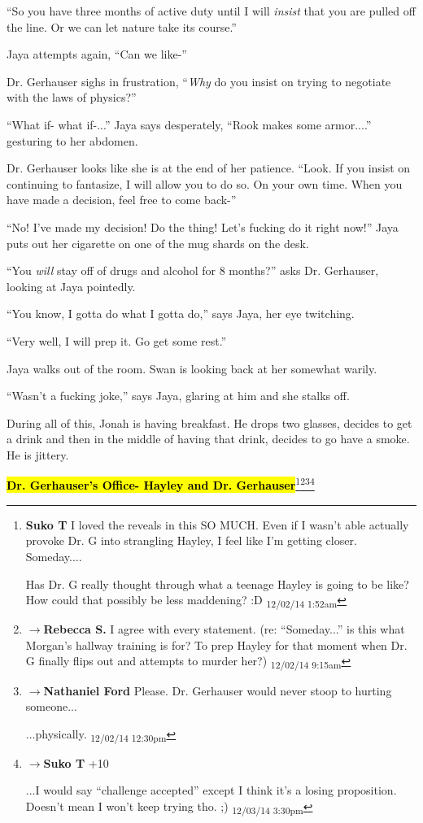 ``So you have three months of active duty until I will \textit{insist} that you are pulled off the line.  Or we can let nature take its course.''

Jaya attempts again, ``Can we like-''

Dr. Gerhauser sighs in frustration, ``\textit{Why} do you insist on trying to negotiate with the laws of physics?''

``What if- what if-...'' Jaya says desperately, ``Rook makes some armor....'' gesturing to her abdomen.

Dr. Gerhauser looks like she is at the end of her patience.  ``Look.  If you insist on continuing to fantasize, I will allow you to do so.  On your own time.  When you have made a decision, feel free to come back-''

``No!  I've made my decision!  Do the thing!  Let's fucking do it right now!'' Jaya puts out her cigarette on one of the mug shards on the desk.

``You \textit{will} stay off of drugs and alcohol for 8 months?'' asks Dr. Gerhauser, looking at Jaya pointedly. 

``You know, I gotta do what I gotta do,'' says Jaya, her eye twitching.

``Very well, I will prep it.  Go get some rest.''

Jaya walks out of the room.  Swan is looking back at her somewhat warily.  

``Wasn't a fucking joke,'' says Jaya, glaring at him and she stalks off.



During all of this, Jonah is having breakfast.  He drops two glasses, decides to get a drink and then in the middle of having that drink, decides to go have a smoke.  He is jittery.





\textbf{\hl{Dr. Gerhauser's Office- Hayley and Dr. Gerhauser}}\footnote{\textbf{Suko T }I loved the reveals in this SO MUCH.  Even if I wasn't able actually provoke Dr. G into strangling Hayley, I feel like I'm getting closer.  Someday....

Has Dr. G really thought through what a teenage Hayley is going to be like?  How could that possibly be less maddening? :D \textsubscript{12/02/14 1:52am}}\footnote{$\rightarrow$\textbf{Rebecca S. }I agree with every statement.
(re: ``Someday...'' is this what Morgan's hallway training is for? To prep Hayley for that moment when Dr. G finally flips out and attempts to murder her?) \textsubscript{12/02/14 9:15am}}\footnote{$\rightarrow$\textbf{Nathaniel Ford }Please. Dr. Gerhauser would never stoop to hurting someone...

...physically. \textsubscript{12/02/14 12:30pm}}\footnote{$\rightarrow$\textbf{Suko T }+10

...I would say ``challenge accepted'' except I think it's a losing proposition.  Doesn't mean I won't keep trying tho. ;) \textsubscript{12/03/14 3:30pm}}



